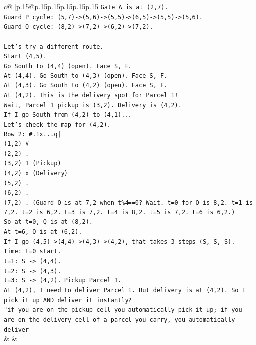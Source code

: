 \documentclass{article}
\begin{document}
{\begin{supertabular}{c@{$\;$}|p{.15\linewidth}@{}p{.15\linewidth}p{.15\linewidth}p{.15\linewidth}p{.15\linewidth}p{.15\linewidth}}
{{{\texttt{Gate A is at (2,7).} \\
\texttt{Guard P cycle: (5,7){-}>(5,6){-}>(5,5){-}>(6,5){-}>(5,5){-}>(5,6).} \\
\texttt{Guard Q cycle: (8,2){-}>(7,2){-}>(6,2){-}>(7,2).} \\
\\ 
\texttt{Let's try a different route.} \\
\texttt{Start (4,5).} \\
\texttt{Go South to (4,4) (open). Face S, F.} \\
\texttt{At (4,4). Go South to (4,3) (open). Face S, F.} \\
\texttt{At (4,3). Go South to (4,2) (open). Face S, F.} \\
\texttt{At (4,2). This is the delivery spot for Parcel 1!} \\
\texttt{Wait, Parcel 1 pickup is (3,2). Delivery is (4,2).} \\
\texttt{If I go South from (4,2) to (4,1)...} \\
\texttt{Let's check the map for (4,2).} \\
\texttt{Row 2: \#.1x...q|} \\
\texttt{(1,2) \#} \\
\texttt{(2,2) .} \\
\texttt{(3,2) 1 (Pickup)} \\
\texttt{(4,2) x (Delivery)} \\
\texttt{(5,2) .} \\
\texttt{(6,2) .} \\
\texttt{(7,2) . (Guard Q is at 7,2 when t\%4==0? Wait. t=0 for Q is 8,2. t=1 is 7,2. t=2 is 6,2. t=3 is 7,2. t=4 is 8,2. t=5 is 7,2. t=6 is 6,2.)} \\
\texttt{So at t=0, Q is at (8,2).} \\
\texttt{At t=6, Q is at (6,2).} \\
\texttt{If I go (4,5){-}>(4,4){-}>(4,3){-}>(4,2), that takes 3 steps (S, S, S).} \\
\texttt{Time: t=0 start.} \\
\texttt{t=1: S {-}> (4,4).} \\
\texttt{t=2: S {-}> (4,3).} \\
\texttt{t=3: S {-}> (4,2). Pickup Parcel 1.} \\
\texttt{At (4,2), I need to deliver Parcel 1. But delivery is at (4,2). So I pick it up AND deliver it instantly?} \\
\texttt{"if you are on the pickup cell you automatically pick it up; if you are on the delivery cell of a parcel you carry, you automatically deliver} \\
            }
        }
    }
    & & \\ \\


\end{supertabular}}
\end{document}
